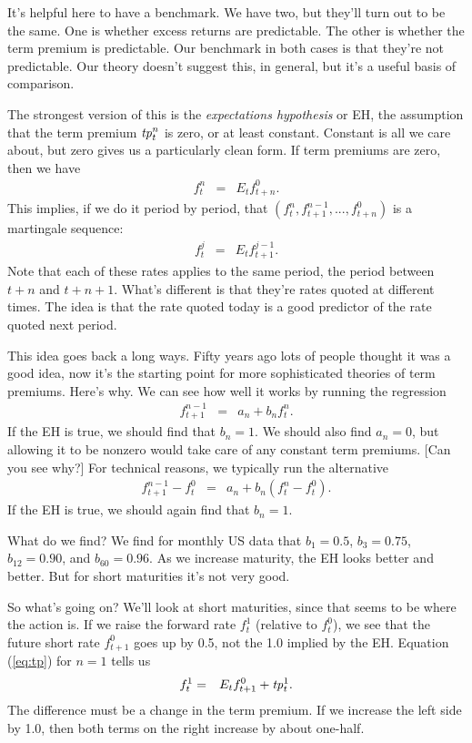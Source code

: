 \documentclass[11pt]{article}
\newcommand{\tp}{\mbox{\it tp\/}}
\begin{document}
It's helpful here to have a benchmark.
We have two, but they'll turn out to be the same.
One is whether excess returns are predictable.
The other is whether the term premium is predictable.
Our benchmark in both cases is that they're not predictable.
Our theory doesn't suggest this, in general,
but it's a useful basis of comparison.

The strongest version of this is the {\it expectations hypothesis\/} or EH,
the assumption that the term premium $\tp^n_t$ is zero, or at least constant.
Constant is all we care about, but zero gives us a particularly clean form.
If term premiums are zero, then we have
\begin{eqnarray*}
    f^n_t &=& E_t f^0_{t+n} .
\end{eqnarray*}
This implies, if we do it period by period, that
$(f^n_t, f^{n-1}_{t+1}, ... , f^0_{t+n})$
is a martingale sequence:
\begin{eqnarray*}
    f^j_t &=& E_t f^{j-1}_{t+1} .
\end{eqnarray*}
Note that each of these rates applies to the same period,
the period between $t+n$ and $t+n+1$.
What's different is that they're rates quoted at different times.
The idea is that the rate quoted today is a good predictor of the rate
quoted next period.

This idea goes back a long ways.
Fifty years ago lots of people thought it was a good idea,
now it's the starting point for more sophisticated theories
of term premiums.
Here's why.
We can see how well it works by running the regression
\begin{eqnarray*}
    f^{n-1}_{t+1} &=& a_n + b_n f^n_t .
\end{eqnarray*}
If the EH is true, we should find that $b_n = 1$.
We should also find $a_n=0$, but allowing it to be nonzero
would take care of any constant term premiums.
[Can you see why?]
For technical reasons, we typically run the alternative
\begin{eqnarray*}
    f^{n-1}_{t+1} - f^0_t &=& a_n + b_n (f^n_t - f^0_t) .
\end{eqnarray*}
If the EH is true, we should again find that $b_n = 1$.

What do we find?
We find for monthly US data that $b_1 = 0.5$, $b_3 = 0.75$,
$b_{12} = 0.90$, and $b_{60} = 0.96$.
As we increase maturity, the EH looks better and better.
But for short maturities it's not very good.

So what's going on?
We'll look at short maturities, since that seems to be where the action is.
If we raise the forward rate $f^1_t$ (relative to $f^0_t$),
we see that the future short rate $f^0_{t+1}$ goes up by 0.5,
not the 1.0 implied by the EH.
Equation (\ref{eq:tp}) for $n=1$ tells us
\begin{eqnarray*}
    f^1_t &=&  E_t f^0_{t+1} + \tp^1_t .
\end{eqnarray*}
The difference must be a change in the term premium.
If we increase the left side by 1.0, then both terms on the right increase
by about one-half.
\end{document}
